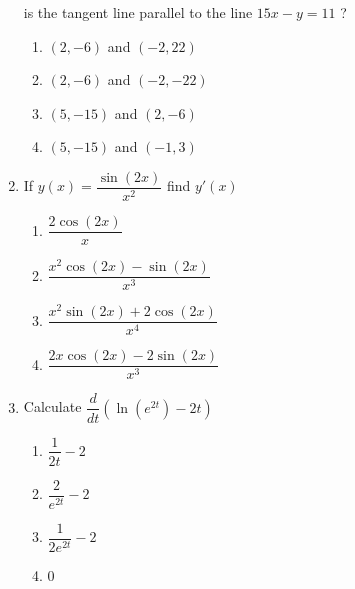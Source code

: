 \documentclass{article}
\begin{document}
\begin{enumerate}
\begin{minipage}[t]{\linewidth}
is the tangent line parallel to the line \(15 x-y=11\) ?\\[0.1em]
		\begin{enumerate}
		\itemsep4em
			\item  $(2,-6)$ and $(-2,22)$
			\item  $(2,-6)$ and $(-2,-22)$
			\item  $(5,-15)$ and $(2,-6)$
			\item  $(5,-15)$ and $(-1,3)$
		\end{enumerate}
	\end{minipage}
	\item
	\begin{minipage}[t]{\linewidth}
		If \(y(x) = \dfrac{\sin(2x)}{x^2}\) find \(y'(x)\)\\[0.1em]
		\begin{enumerate}
		\itemsep1em
			\item  $\dfrac{ 2 \cos(2x)}{x}$
			\item  $\dfrac{ x^2 \cos(2x) - \sin(2x)} { x^3}$
			\item  $\dfrac{ x^2 \sin(2x) + 2 \cos(2x)} {x^4}$
			\item  $\dfrac{2 x \cos(2 x) - 2 \sin(2 x)}{x^3}$
		\end{enumerate}
	\end{minipage}
	\item
	\begin{minipage}[t]{\linewidth}
		Calculate \(\dfrac{d}{dt} \left( \ln(e^{2t}) - 2t \right)\)\\[0.1em]
		\begin{enumerate}
		\itemsep1em
			\item  $\dfrac{1}{2t}-2$
			\item  $\dfrac{2}{e^{2t}}-2$
			\item  $\dfrac{1}{2e^{2t}}-2$
			\item  0
		\end{enumerate}
	\end{minipage}
\end{enumerate}
\end{document}
